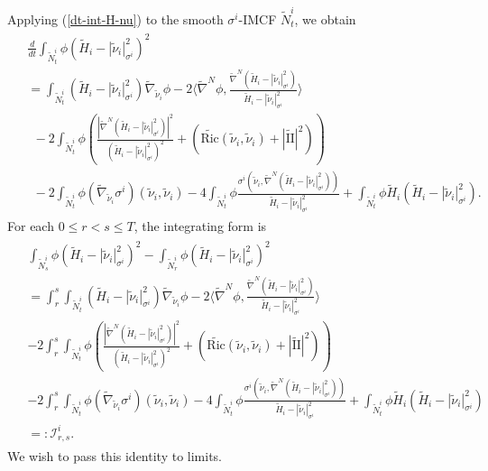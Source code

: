 \documentclass[11pt, letterpaper]{amsart}
\theoremstyle{definition}
\theoremstyle{remark}
\begin{document}
Applying (\ref{dt-int-H-nu}) to the smooth $\sigma ^{i}$-IMCF $\tilde{N}^{i}_t$, we obtain
\begin{align}\label{ddt-identity-i}
	\begin{split}
		&\frac{d}{d t} \int_{\tilde{N}^{i}_t} \phi (\tilde{H}_{i}- |\tilde{\nu}_{i} |^2_{\sigma ^{i} })^2 \\							&= \int_{\tilde{N}^{i}_t} (\tilde{H}_{i}-|\tilde{\nu}_i |^2_{\sigma ^{i} }) \tilde{\nabla} _{\tilde{\nu}_i }\phi -2 \langle \tilde{\nabla} ^{N} \phi , \frac{\tilde{\nabla} ^{N}(\tilde{H}_i-|\tilde{\nu}_i |^2_{\sigma^{i} })}{\tilde{H}_i- |\tilde{\nu}_i |^2_{\sigma ^{i} }} \rangle \\
		&\ \ - 2 \int_{\tilde{N}^{i}_t}\phi \left(   \frac{|\tilde{\nabla} ^{N} (\tilde{H}_i-|\tilde{\nu}_i |^2_{\sigma^{i} })|^2}{(\tilde{H}_i-|\tilde{\nu}_i |^2_{\sigma^{i} })^2} + \left( \tilde{\mathrm{Ric}}(\tilde{\nu}_i ,\tilde{\nu}_i ) +|\tilde{\mathrm{II}}|^2 \right) \right) \\
		&\ \ -2 \int_{\tilde{N}^{i}_t} \phi (\tilde{\nabla} _{\tilde{\nu}_i } \sigma^{i}) (\tilde{\nu}_i , \tilde{\nu}_i ) - 4 \int_{\tilde{N}^i_t} \phi \frac{\sigma ^{i}( \tilde{\nu}_i , \tilde{\nabla} ^{N}(\tilde{H}_i- |\tilde{\nu}_i |^2_{\sigma^{i} }) )}{\tilde{H}_i- |\tilde{\nu}_i |^2_{\sigma ^{i}}} + \int_{\tilde{N}^{i}_t}\phi \tilde{H}_i(\tilde{H}_i-|\tilde{\nu}_i |^2_{\sigma^{i} }).
	\end{split}
\end{align}
For each $0\leq r<s \leq T$, the integrating form is
\begin{align}\label{ddt-integral-identity-i}
	\begin{split}
		& \int_{\tilde{N}^{i}_s} \phi (\tilde{H}_{i}- |\tilde{\nu}_{i} |^2_{\sigma ^{i} })^2 - \int_{\tilde{N}^{i}_r} \phi (\tilde{H}_{i}- |\tilde{\nu}_{i} |^2_{\sigma ^{i} })^2 \\							&= \int_{r}^{s}\int_{\tilde{N}^{i}_t} (\tilde{H}_{i}-|\tilde{\nu}_i |^2_{\sigma ^{i} }) \tilde{\nabla} _{\tilde{\nu}_i }\phi -2 \langle \tilde{\nabla} ^{N} \phi , \frac{\tilde{\nabla} ^{N}(\tilde{H}_i-|\tilde{\nu}_i |^2_{\sigma^{i} })}{\tilde{H}_i- |\tilde{\nu}_i |^2_{\sigma ^{i} }} \rangle \\
		&- 2 \int_{r}^{s}\int_{\tilde{N}^{i}_t}\phi \left(   \frac{|\tilde{\nabla} ^{N} (\tilde{H}_i-|\tilde{\nu}_i |^2_{\sigma^{i} })|^2}{(\tilde{H}_i-|\tilde{\nu}_i |^2_{\sigma^{i} })^2} + \left( \tilde{\mathrm{Ric}}(\tilde{\nu}_i ,\tilde{\nu}_i ) +|\tilde{\mathrm{II}}|^2 \right) \right) \\
		&-2 \int_{r}^{s}\int_{\tilde{N}^{i}_t} \phi (\tilde{\nabla} _{\tilde{\nu}_i } \sigma^{i}) (\tilde{\nu}_i , \tilde{\nu}_i ) - 4 \int_{\tilde{N}^i_t} \phi \frac{\sigma ^{i}( \tilde{\nu}_i , \tilde{\nabla} ^{N}(\tilde{H}_i- |\tilde{\nu}_i |^2_{\sigma^{i} }) )}{\tilde{H}_i- |\tilde{\nu}_i |^2_{\sigma ^{i}}} + \int_{\tilde{N}^{i}_t}\phi \tilde{H}_i(\tilde{H}_i-|\tilde{\nu}_i |^2_{\sigma^{i} })\\
		&=: \mathcal{I}^{i}_{r,s}.
	\end{split}
\end{align}
We wish to pass this identity to limits.
\end{document}
